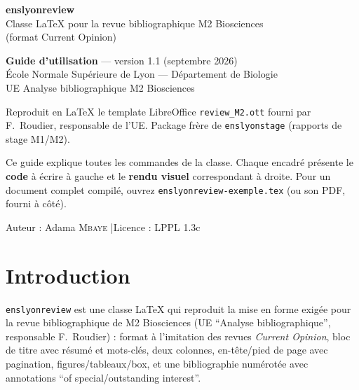 \documentclass[11pt, a4paper]{article}
\begin{document}
\begin{titlepage}
\centering
\vspace*{2cm}
{\Huge\bfseries\color{ENSorange} enslyonreview}\\[8pt]
{\Large Classe \LaTeX{} pour la revue bibliographique M2 Biosciences}\\[4pt]
{\large (format Current Opinion)}\\[2cm]

\colorbox{ENSmeta}{\parbox{0.7\linewidth}{\centering\vspace{4pt}
  \textbf{Guide d'utilisation} — version 1.1 (septembre 2026)\\
  École Normale Supérieure de Lyon — Département de Biologie\\
  UE Analyse bibliographique M2 Biosciences\vspace{4pt}}}

\vspace{2cm}
Reproduit en \LaTeX{} le template LibreOffice \texttt{review\_M2.ott}
fourni par F.~Roudier, responsable de l'UE. Package frère de
\texttt{enslyonstage} (rapports de stage M1/M2).

\vspace{1.5cm}
\begin{tcolorbox}[colback=darkbg, colframe=ENSorange!40, width=0.85\linewidth,
                   left=8pt, right=8pt]
\small\sffamily
Ce guide explique toutes les commandes de la classe. Chaque encadré
présente le \textbf{code} à écrire à gauche et le \textbf{rendu visuel}
correspondant à droite. Pour un document complet compilé, ouvrez
\texttt{enslyonreview-exemple.tex} (ou son PDF, fourni à côté).
\end{tcolorbox}

\vfill
{\small Auteur : Adama \textsc{Mbaye} \quad|\quad Licence : LPPL 1.3c}
\end{titlepage}

\tableofcontents
\clearpage

\section{Introduction}
\label{sec:intro}

\texttt{enslyonreview} est une classe \LaTeX{} qui reproduit la mise en
forme exigée pour la revue bibliographique de M2 Biosciences (UE
``Analyse bibliographique'', responsable F.~Roudier) : format à l'imitation
des revues \emph{Current Opinion}, bloc de titre avec résumé et mots-clés,
deux colonnes, en-tête/pied de page avec pagination, figures/tableaux/box,
et une bibliographie numérotée avec annotations ``of special/outstanding
interest''.
\end{document}
